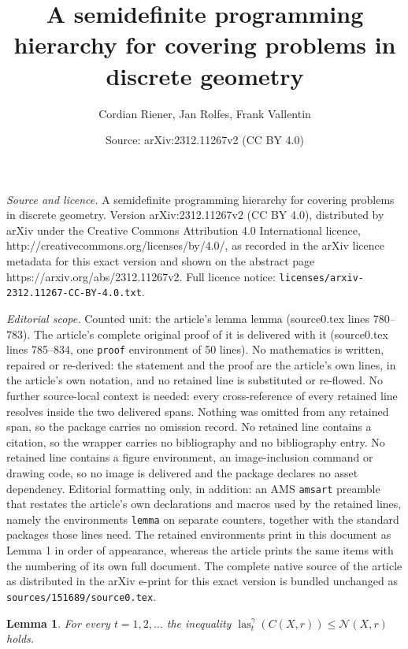\documentclass[10pt,a4paper]{amsart}
\title{A semidefinite programming hierarchy for covering problems in discrete geometry}
\author{Cordian Riener, Jan Rolfes, Frank Vallentin}
\date{Source: arXiv:2312.11267v2 (CC BY 4.0)}
\newtheorem{lemma}{Lemma}
\DeclareMathOperator{\las}{las}
\begin{document}
\maketitle

\noindent\emph{Source and licence.} A semidefinite programming hierarchy for covering problems in discrete geometry. Version arXiv:2312.11267v2 (CC BY 4.0), distributed by arXiv under the Creative Commons Attribution 4.0 International licence, http://creativecommons.org/licenses/by/4.0/, as recorded in the arXiv licence metadata for this exact version and shown on the abstract page https://arxiv.org/abs/2312.11267v2. Full licence notice: \texttt{licenses/arxiv-2312.11267-CC-BY-4.0.txt}.\par\smallskip

\noindent\textit{Editorial scope.} Counted unit: the article's lemma lemma (source0.tex lines 780--783). The article's complete original proof of it is delivered with it (source0.tex lines 785--834, one \texttt{proof} environment of 50 lines). No mathematics is written, repaired or re-derived: the statement and the proof are the article's own lines, in the article's own notation, and no retained line is substituted or re-flowed.  No further source-local context is needed: every cross-reference of every retained line resolves inside the two delivered spans.  Nothing was omitted from any retained span, so the package carries no omission record.  No retained line contains a citation, so the wrapper carries no bibliography and no bibliography entry.  No retained line contains a figure environment, an image-inclusion command or drawing code, so no image is delivered and the package declares no asset dependency.  Editorial formatting only, in addition: an AMS \texttt{amsart} preamble that restates the article's own declarations and macros used by the retained lines, namely the environments \texttt{lemma} on separate counters, together with the standard packages those lines need.  The retained environments print in this document as Lemma 1 in order of appearance, whereas the article prints the same items with the numbering of its own full document.  The complete native source of the article as distributed in the arXiv e-print for this exact version is bundled unchanged as \texttt{sources/151689/source0.tex}.
\begin{lemma}
  For every $t = 1, 2, \ldots$ the inequality
  $\las^\gamma_t(C(X,r)) \leq \mathcal{N}(X,r)$ holds.
\end{lemma}
\end{document}
